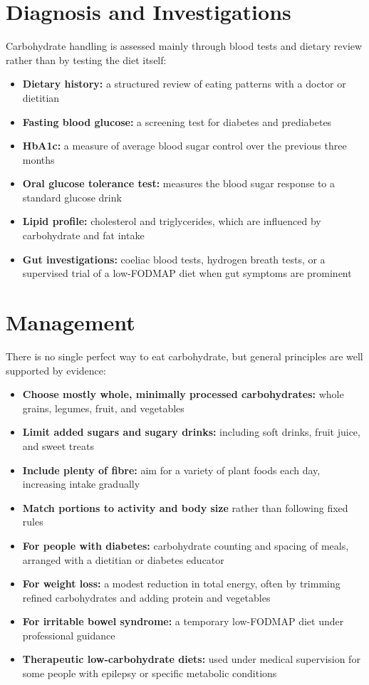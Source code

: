 \section*{Diagnosis and Investigations}
Carbohydrate handling is assessed mainly through blood tests and dietary review rather than by testing the diet itself:
\begin{itemize}
    \item \textbf{Dietary history:} a structured review of eating patterns with a doctor or dietitian
    \item \textbf{Fasting blood glucose:} a screening test for diabetes and prediabetes
    \item \textbf{HbA1c:} a measure of average blood sugar control over the previous three months
    \item \textbf{Oral glucose tolerance test:} measures the blood sugar response to a standard glucose drink
    \item \textbf{Lipid profile:} cholesterol and triglycerides, which are influenced by carbohydrate and fat intake
    \item \textbf{Gut investigations:} coeliac blood tests, hydrogen breath tests, or a supervised trial of a low-FODMAP diet when gut symptoms are prominent
\end{itemize}

\section*{Management}
There is no single perfect way to eat carbohydrate, but general principles are well supported by evidence:
\begin{itemize}
    \item \textbf{Choose mostly whole, minimally processed carbohydrates:} whole grains, legumes, fruit, and vegetables
    \item \textbf{Limit added sugars and sugary drinks:} including soft drinks, fruit juice, and sweet treats
    \item \textbf{Include plenty of fibre:} aim for a variety of plant foods each day, increasing intake gradually
    \item \textbf{Match portions to activity and body size} rather than following fixed rules
    \item \textbf{For people with diabetes:} carbohydrate counting and spacing of meals, arranged with a dietitian or diabetes educator
    \item \textbf{For weight loss:} a modest reduction in total energy, often by trimming refined carbohydrates and adding protein and vegetables
    \item \textbf{For irritable bowel syndrome:} a temporary low-FODMAP diet under professional guidance
    \item \textbf{Therapeutic low-carbohydrate diets:} used under medical supervision for some people with epilepsy or specific metabolic conditions
\end{itemize}


